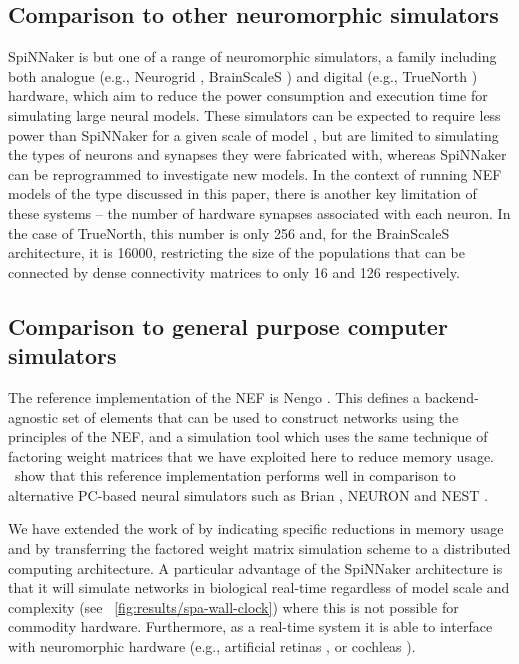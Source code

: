 \documentclass[conference]{IEEEtran}
\begin{document}
  \subsection{Comparison to other neuromorphic simulators}

  SpiNNaker is but one of a range of neuromorphic simulators, a family including both analogue (e.g., Neurogrid \parencite{Benjamin2014}, BrainScaleS \parencite{Schemmel2010}) and digital (e.g., TrueNorth \parencite{Merolla2014}) hardware, which aim to reduce the power consumption and execution time for simulating large neural models.
  These simulators can be expected to require less power than SpiNNaker for a given scale of model \parencite{Stromatias2013}, but are limited to simulating the types of neurons and synapses they were fabricated with, whereas SpiNNaker can be reprogrammed to investigate new models.
  In the context of running NEF models of the type discussed in this paper, there is another key limitation of these systems -- the number of hardware synapses associated with each neuron. In the case of TrueNorth, this number is only \num{256} and, for the BrainScaleS architecture, it is \num{16000}, restricting the size of the populations that can be connected by dense connectivity matrices to only 16 and 126 respectively.

  \subsection{Comparison to general purpose computer simulators}

  The reference implementation of the NEF is Nengo \parencite{Bekolay2014}.
  This defines a backend-agnostic set of elements that can be used to construct networks using the principles of the NEF, and a simulation tool which uses the same technique of factoring weight matrices that we have exploited here to reduce memory usage.
  \textcite*{Bekolay2014}\ show that this reference implementation performs well in comparison to alternative PC-based neural simulators such as Brian \parencite{Goodman2009}, NEURON \parencite{carnevale2006neuron} and NEST \parencite{Gewaltig2007}.

  We have extended the work of \citeauthor*{Bekolay2014} by indicating specific reductions in memory usage and by transferring the factored weight matrix simulation scheme to a distributed computing architecture.
  A particular advantage of the SpiNNaker architecture is that it will simulate networks in biological real-time regardless of model scale and complexity (see \figurename~\ref{fig:results/spa-wall-clock}) where this is not possible for commodity hardware.
  Furthermore, as a real-time system it is able to interface with neuromorphic hardware (e.g., artificial retinas \parencite{}, or cochleas \parencite{}).
\end{document}
